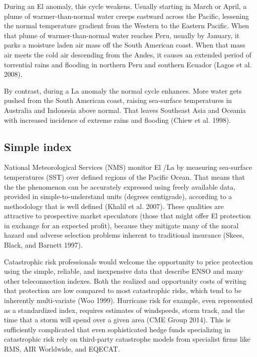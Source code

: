 \documentclass[article]{jss}
\begin{document}
During an El  anomaly, this cycle weakens. Usually starting
in March or April, a plume of warmer-than-normal water creeps eastward
across the Pacific, lessening the normal temperature gradient from the
Western to the Eastern Pacific. When that plume of warmer-than-normal
water reaches Peru, usually by January, it parks a moisture laden air
mass off the South American coast. When that mass air meets the cold air
descending from the Andes, it causes an extended period of torrential
rains and flooding in northern Peru and southern Ecuador (Lagos et al.
2008).

By contrast, during a La  anomaly the normal cycle
enhances. More water gets pushed from the South American coast, raising
sea-surface temperatures in Australia and Indonesia above normal. That
leaves Southeast Asia and Oceania with increased incidence of extreme
rains and flooding (Chiew et al. 1998).

\subsection{Simple index}\label{simple-index}

National Meteorological Services (NMS) monitor El /La
 by measuring sea-surface temperatures (SST) over defined
regions of the Pacific Ocean. That means that the the phenomenon can be
accurately expressed using freely available data, provided in
simple-to-understand units (degrees centigrade), according to a
methodology that is well defined (Khalil et al. 2007). These qualities
are attractive to prospective market speculators (those that might offer
El  protection in exchange for an expected profit), because
they mitigate many of the moral hazard and adverse selection problems
inherent to traditional insurance (Skees, Black, and Barnett 1997).

Catastrophic risk professionals would welcome the opportunity to price
protection using the simple, reliable, and inexpensive data that
describe ENSO and many other teleconnection indexes. Both the realized
and opportunity costs of writing that protection are low compared to
most catastrophic risks, which tend to be inherently multi-variate (Woo
1999). Hurricane risk for example, even represented as a standardized
index, requires estimates of windspeeds, storm track, and the time that
a storm will spend over a given area (CME Group 2014). This is
sufficiently complicated that even sophisticated hedge funds
specializing in catastrophic risk rely on third-party catastrophe models
from specialist firms like RMS, AIR Worldwide, and EQECAT.
\end{document}
